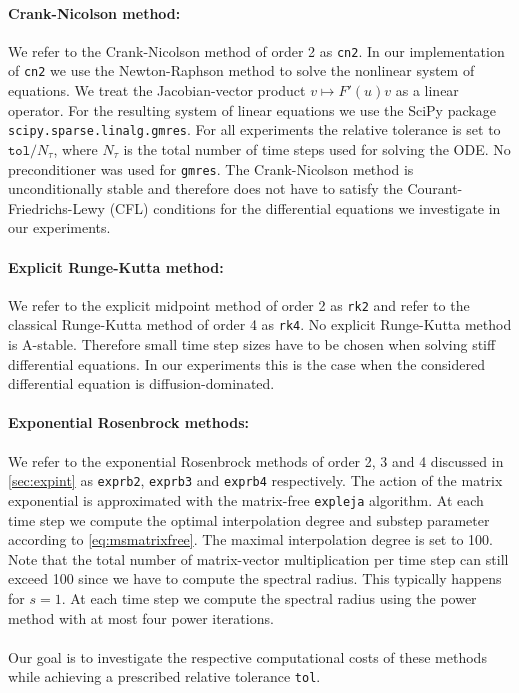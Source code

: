 \documentclass{scrartcl}
\begin{document}
	\paragraph{Crank-Nicolson method:}
	We refer to the Crank-Nicolson method of order 2 as \texttt{cn2}.
	In our implementation of \texttt{cn2} we use the Newton-Raphson method to solve the nonlinear system of equations. We treat the Jacobian-vector product $v\mapsto F'(u)v$ as a linear operator. For the resulting system of linear equations we use the SciPy package \texttt{scipy.sparse.linalg.gmres}. For all experiments the relative tolerance is set to $\texttt{tol}/N_\tau$, where $N_\tau$ is the total number of time steps used for solving the ODE. No preconditioner was used for \texttt{gmres}. The Crank-Nicolson method is unconditionally stable and therefore does not have to satisfy the Courant-Friedrichs-Lewy (CFL) conditions for the differential equations we investigate in our experiments.
	
	\paragraph{Explicit Runge-Kutta method:}
	We refer to the explicit midpoint method of order 2 as \texttt{rk2} and refer to the classical Runge-Kutta method of order 4 as \texttt{rk4}. No explicit Runge-Kutta method is A-stable. Therefore small time step sizes have to be chosen when solving stiff differential equations. In our experiments this is the case when the considered differential equation is diffusion-dominated.
	
	\paragraph{Exponential Rosenbrock methods:}
	We refer to the exponential Rosenbrock methods of order 2, 3 and 4 discussed in \ref{sec:expint} as \texttt{exprb2}, \texttt{exprb3} and \texttt{exprb4} respectively.
	The action of the matrix exponential is approximated with the matrix-free \texttt{expleja} algorithm. At each time step we compute the optimal interpolation degree and substep parameter according to \eqref{eq:msmatrixfree}. 
	The maximal interpolation degree is set to 100. Note that the total number of matrix-vector multiplication per time step can still exceed 100 since we have to compute the spectral radius. This typically happens for $s=1$. At each time step we compute the spectral radius using the power method with at most four power iterations.\\
	\\
	Our goal is to investigate the respective computational costs of these methods while achieving a prescribed relative tolerance \texttt{tol}.
\end{document}
